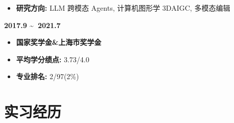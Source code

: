\documentclass[UTF8,AutoFakeBold]{resume}
\begin{document}
    \begin{itemize}
      \item \kaishu\textbf{研究方向: }LLM 跨模态 Agents, 计算机图形学 3DAIGC, 多模态编辑
    \end{itemize}
{\quad \textbf{2017.9 \textasciitilde \ 2021.7}}
    \begin{minipage}[t]{0.30\textwidth}
    	\begin{itemize}
    		\item \kaishu\textbf{国家奖学金\&上海市奖学金}
    	\end{itemize}
    \end{minipage}
    \begin{minipage}[t]{0.25\textwidth}
    	\begin{itemize}
    		\item \kaishu\textbf{平均学分绩点: }3.73/4.0
    	\end{itemize}
    \end{minipage}
    \begin{minipage}[t]{0.25\textwidth}
    	\begin{itemize}
    		\item \kaishu\textbf{专业排名: }2/97(2\%)
    	\end{itemize}
    \end{minipage}

\section{\hspace{0.25em}\makebox[0.75em][c]{\faUsers} \fangsong\textbf{实习经历}}
\end{document}
